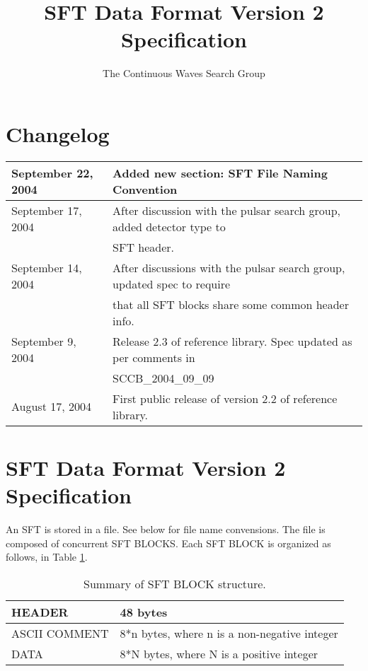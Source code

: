 \documentclass{ligodcc}
\title{SFT Data Format Version 2 Specification}
\author{The Continuous Waves Search Group}
\begin{document}
\maketitle

\section{Changelog}


\begin{table}[ht]
\centering
\begin{tabular}{|l|l|}
\hline
September 22, 2004 & Added new section: SFT File Naming Convention \\
\hline
September 17, 2004 & After discussion with the pulsar search group, added detector type to\\
   & SFT header. \\
\hline
September 14, 2004 & After discussions with the pulsar search group, updated spec to require\\
   & that all SFT blocks share some common header info. \\
\hline
September 9, 2004 & Release 2.3 of reference library.  Spec updated as per comments in\\
   & SCCB\_2004\_09\_09 \\
\hline
August 17, 2004  & First public release of version 2.2 of reference library. \\
\hline
\end{tabular}
\end{table}
 


\section{SFT Data Format Version 2 Specification}

An SFT is stored in a file. See below for file name convensions. The
file is composed of concurrent SFT BLOCKS. Each SFT BLOCK is organized as follows,
in Table \ref{tab:summary_struct}.

\begin{table}[ht]
\centering
\begin{tabular}{|l|l|}
\hline
   HEADER & 48 bytes\\
\hline

 ASCII COMMENT & 8*n bytes,
 where n is a non-negative
 integer\\
\hline

  DATA & 8*N bytes,
 where N is a positive
 integer\\
\hline
\end{tabular}
\caption{Summary of SFT BLOCK structure.}
\label{tab:summary_struct}
\end{table}
\end{document}
